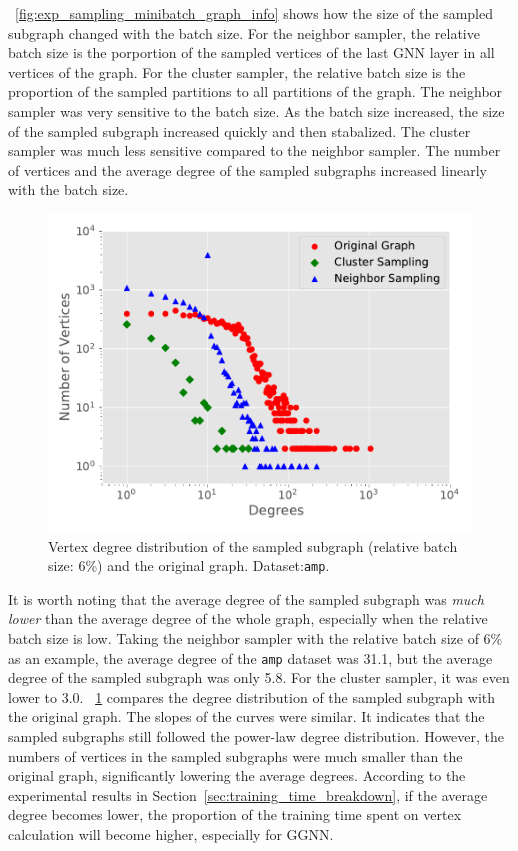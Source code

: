\figurename~\ref{fig:exp_sampling_minibatch_graph_info} shows how the size of the sampled subgraph changed with the batch size.
For the neighbor sampler, the relative batch size is the porportion of the sampled vertices of the last GNN layer in all vertices of the graph.
For the cluster sampler, the relative batch size is the proportion of the sampled partitions to all partitions of the graph.
The neighbor sampler was very sensitive to the batch size.
As the batch size increased, the size of the sampled subgraph increased quickly and then stabalized.
The cluster sampler was much less sensitive compared to the neighbor sampler.
The number of vertices and the average degree of the sampled subgraphs increased linearly with the batch size.

\begin{figure}
    \centering
    \includegraphics[width=0.4\columnwidth]{figs/experiments/exp_sampling_minibatch_degrees_distribution_amazon-photo.pdf}
    \caption{Vertex degree distribution of the sampled subgraph (relative batch size: 6\%) and the original graph. Dataset:\texttt{amp}.}
    \label{fig:exp_sampling_minibatch_degrees_distribution}
\end{figure}

It is worth noting that the average degree of the sampled subgraph was \emph{much lower} than the average degree of the whole graph, especially when the relative batch size is low.
Taking the neighbor sampler with the relative batch size of 6\% as an example, the average degree of the \texttt{amp} dataset was 31.1, but the average degree of the sampled subgraph was only 5.8.
For the cluster sampler, it was even lower to 3.0.
\figurename~\ref{fig:exp_sampling_minibatch_degrees_distribution} compares the degree distribution of the sampled subgraph with the original graph.
The slopes of the curves were similar.
It indicates that the sampled subgraphs still followed the power-law degree distribution.
However, the numbers of vertices in the sampled subgraphs were much smaller than the original graph, significantly lowering the average degrees.
According to the experimental results in Section~\ref{sec:training_time_breakdown}, if the average degree becomes lower, the proportion of the training time spent on vertex calculation will become higher, especially for GGNN.


